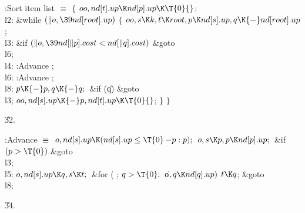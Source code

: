 \Y\B\4:Sort item list \X${}\equiv{}$\6
${}\{{}$\1\6
${}\\{oo},\39\\{nd}[\|t].\\{up}\K\\{nd}[\|p].\\{up}\K\T{0}{}$;\6
\4\\{l2}:\5
\&{while} ${}(\|o,\39\\{nd}[\\{root}].\\{up}){}$\5
${}\{{}$\1\6
${}\\{oo},\39\|s\K\|k,\39\|t\K\\{root},\39\|p\K\\{nd}[\|s].\\{up},\39\|q\K{-}%
\\{nd}[\\{root}].\\{up}{}$;\6
\4\\{l3}:\5
\&{if} ${}(\|o,\39\\{nd}[\|p].\\{cost}<\\{nd}[\|q].\\{cost}){}$\1\5
\&{goto} \\{l6};\2\6
\4\\{l4}:\5
:Advance \X;\6
\4\\{l6}:\5
:Advance \X;\6
\4\\{l8}:\5
${}\|p\K{-}\|p,\39\|q\K{-}\|q;{}$\6
\&{if} (\|q)\1\5
\&{goto} \\{l3};\2\6
${}\\{oo},\39\\{nd}[\|s].\\{up}\K{-}\|p,\39\\{nd}[\|t].\\{up}\K\T{0}{}$;\6
\4${}\}{}$\2\6
\4${}\}{}$\2\par
\U32.\fi

\B{}:Advance \X${}\equiv{}$\6
$\|o,\39\\{nd}[\|s].\\{up}\K(\\{nd}[\|s].\\{up}\Z\T{0}\?{-}\|p:\|p);{}$\6
${}\|o,\39\|s\K\|p,\39\|p\K\\{nd}[\|p].\\{up};{}$\6
\&{if} ${}(\|p>\T{0}){}$\1\5
\&{goto} \\{l3};\2\6
\4\\{l5}:\5
${}\|o,\39\\{nd}[\|s].\\{up}\K\|q,\39\|s\K\|t;{}$\6
\&{for} ( ; ${}\|q>\T{0};{}$ \|o${},\39\|q\K\\{nd}[\|q].\\{up}){}$\1\5
${}\|t\K\|q{}$;\2\6
\&{goto} \\{l8};\par
\U34.\fi

